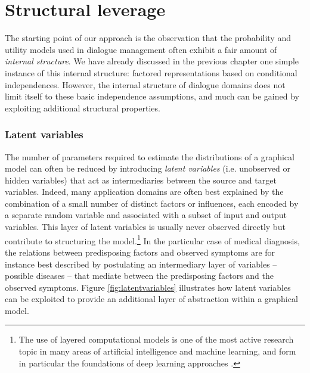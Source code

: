 \section{Structural leverage}
\label{sec:rmotivation}

The starting point of our approach is the observation that the probability and utility models used in dialogue management often exhibit a fair amount of \textit{internal structure}.  
We have already discussed in the previous chapter one simple instance of this internal structure: factored representations based on conditional independences. However, the internal structure of dialogue domains does not limit itself to these basic independence assumptions, and much can be gained by exploiting additional structural properties. 



\subsubsection*{Latent variables}
 
The number of parameters required to estimate the distributions of a graphical model can often be reduced by introducing \textit{latent variables} (i.e. unobserved or hidden variables) that act as intermediaries between the source and target variables. Indeed, many application domains are often best explained by the combination of a small number of distinct factors or influences, each encoded by a separate random variable and associated with a subset of input and output variables. This layer of latent variables is usually never observed directly but contribute to structuring the model.\footnote{The use of layered computational models is one of the most active research topic in many areas of artificial intelligence and machine learning, and form in particular the foundations of deep learning approaches \citep{Bengio:2009}.} In the particular case of medical diagnosis, the relations between predisposing factors and observed symptoms are for instance best described by postulating an intermediary layer of variables -- possible diseases -- that mediate between the predisposing factors and the observed symptoms.  Figure \ref{fig:latentvariables} illustrates how latent variables can be exploited to provide an additional layer of abstraction within a graphical model.

